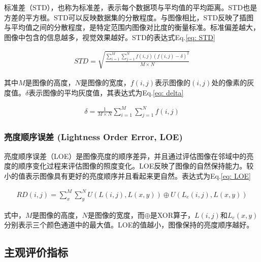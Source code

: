 \documentclass[letterpaper,12pt]{article}
\begin{document}
			标准差（STD），也称为标准差，表示每个数据项与平均值的平均距离。STD也是方差的平方根。STD可以反映数据集的分散程度。与图像相比，STD反映了插图与平均值之间的分散程度，是特定范围内图像对比度的衡量标准。标准偏差越大，图像中包含的信息越多，视觉效果越好。STD的表达式Eq.\ref{eq: STD}
			
			\begin{equation}
				\begin{aligned}
					STD = \sqrt{\frac{\sum_{i=1}^{M} \sum_{j=1}^{N} f(i,j)\left( f(i,j)-\delta \right)^{2}}{M \times N}}
				\end{aligned}
				\label{eq: STD}
			\end{equation}
			
			其中$M$是图像的高度，$N$是图像的宽度，$f(i, j)$表示图像的$(i, j)$处的像素的灰度值。$\delta$表示图像的平均灰度值，其表达式为Eq.\ref{eq: delta}
			
			\begin{equation}
				\begin{aligned}
					\delta = \frac{1}{M \times N} \sum_{i=1}^{M} \sum_{j=1}^{N} f(i,j)
				\end{aligned}
				\label{eq: delta}
			\end{equation}
			
			\subsubsection{亮度顺序误差 (Lightness Order Error, LOE)}
			
			亮度顺序误差（LOE）是图像亮度的顺序差异，并且通过评估图像在邻域中的亮度的顺序变化过程来评估图像的照度变化。LOE反映了图像的自然保持能力。较小的值表示图像具有更好的亮度顺序并且看起来更自然。表达式为Eq.\ref{eq: LOE}
			
			\begin{equation}
				\begin{aligned}
					RD(i,j) = \sum_{x}^{M} \sum_{y}^{N} U\left( L(i,j), L(x,y) \right) \oplus U\left( L_{e}(i,j), L(x,y) \right) 
				\end{aligned}
				\label{eq: LOE}
			\end{equation}
			
			式中，$M$是图像的高度，$N$是图像的宽度，而$\oplus$是XOR算子，$L(i, j)$和$L_{e}(x, y)$分别表示三个颜色通道中的最大值。LOE的值越小，图像保持的亮度顺序越好。
			
		\subsection{主观评价指标}
		
\end{document}

